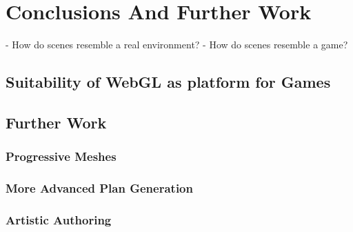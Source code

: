 \chapter{Conclusions And Further Work}
 - How do scenes resemble a real environment?
 - How do scenes resemble a game?

\section{Suitability of WebGL as platform for Games}

\section{Further Work}

\subsection{Progressive Meshes}

\subsection{More Advanced Plan Generation}

\subsection{Artistic Authoring}
